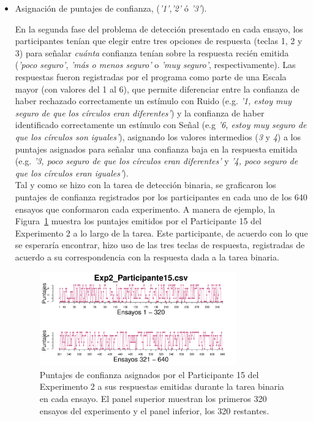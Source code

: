 \begin{itemize}

	\item Asignación de puntajes de confianza, (\textit{'1'},\textit{'2'} ó \textit{'3'}).

En la segunda fase del problema de detección presentado en cada ensayo, los participantes tenían que elegir entre tres opciones de respuesta (teclas 1, 2 y 3) para señalar \textit{cuánta} confianza tenían sobre la respuesta recién emitida (\textit{'poco seguro'}, \textit{'más o menos seguro'} o \textit{'muy seguro'}, respectivamente). Las respuestas fueron registradas por el programa como parte de una Escala mayor (con valores del 1 al 6), que permite diferenciar entre la confianza de haber rechazado correctamente un estímulo con Ruido (e.g. \textit{'1, estoy muy seguro de que los círculos eran diferentes'}) y la confianza de haber identificado correctamente un estímulo con Señal (e.g \textit{'6, estoy muy seguro de que los círculos son iguales'}), asignando los valores intermedios (\textit{3} y \textit{4}) a los puntajes asignados para señalar una confianza baja en la respuesta emitida (e.g. \textit{'3, poco seguro de que los círculos eran diferentes'} y \textit{'4, poco seguro de que los círculos eran iguales'}).\\

Tal y como se hizo con la tarea de detección binaria, se graficaron los puntajes de confianza registrados por los participantes en cada uno de los 640 ensayos que conformaron cada experimento. A manera de ejemplo, la Figura~\ref{fig:Rating_E2_P4} muestra los puntajes emitidos por el Participante 15 del Experimento 2 a lo largo de la tarea. Este participante, de acuerdo con lo que se esperaría encontrar, hizo uso de las tres teclas de respuesta, registradas de acuerdo a su correspondencia con la respuesta dada a la tarea binaria.\\ 
 
\begin{figure}[th]
\centering
\includegraphics[width=0.80\textwidth]{Figures/Rating_Exp2_P15} 
\caption[Explorando datos individuales (ejemplo): Puntaje de confianza emitido por cada ensayo]{Puntajes de confianza asignados por el Participante 15 del Experimento 2 a sus respuestas emitidas durante la tarea binaria en cada ensayo. El panel superior muestran los primeros 320 ensayos del experimento y el panel inferior, los 320 restantes.}
\label{fig:Rating_E2_P4}
\end{figure}


\end{itemize}
